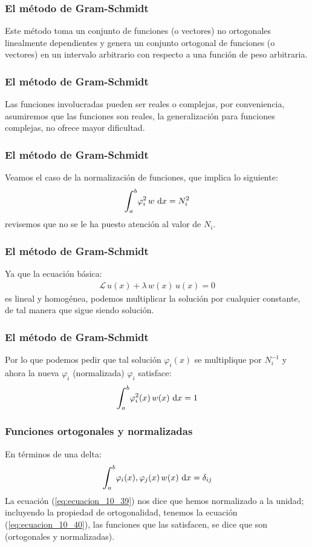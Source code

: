 \documentclass[12pt]{beamer}
\begin{document}
\begin{frame}
\frametitle{El método de Gram-Schmidt}
Este método toma un conjunto de funciones (o vectores) no ortogonales linealmente dependientes y genera un conjunto ortogonal de funciones (o vectores) en un intervalo arbitrario con respecto a una función de peso arbitraria.
\end{frame}
\begin{frame}
\frametitle{El método de Gram-Schmidt}
Las funciones involucradas pueden ser reales o complejas, por conveniencia, asumiremos que las funciones son reales, la generalización para funciones complejas, no ofrece mayor dificultad.
\end{frame}
\begin{frame}
\frametitle{El método de Gram-Schmidt}
Veamos el caso de la normalización de funciones, que implica lo siguiente:
\pause
\begin{align*}
\scaleint{6ex}_{\bs a}^{b} \varphi_{i}^{2} \, w \, \dd{x}  =  N_{i}^{2}
\end{align*}
revisemos que no se le ha puesto atención al valor de $N_{i}$.
\end{frame}
\begin{frame}
\frametitle{El método de Gram-Schmidt}
Ya que la ecuación básica:
\pause
\begin{align}
\mathcal{L} \, u(x) + \lambda \, w(x) \, u(x) = 0
\label{eq:ecuacion_10_08}
\end{align}
es lineal y homogénea, podemos multiplicar la solución por cualquier constante, de tal manera que sigue siendo solución.
\end{frame}
\begin{frame}
\frametitle{El método de Gram-Schmidt}
Por lo que podemos pedir que tal solución $\varphi_{i}(x)$ se multiplique por $N_{i}^{-1}$ y ahora la nueva $\varphi_{i}$ (normalizada) $\varphi_{i}$ satisface:
\pause
\begin{align}
\scaleint{6ex}_{\bs a}^{b} \varphi_{i}^{2} (x) \, w(x) \, \dd{x} = 1
\label{eq:ecuacion_10_39}
\end{align}
\end{frame}
\begin{frame}
\frametitle{Funciones ortogonales y normalizadas}
En términos de una delta:
\pause
\begin{align}
\scaleint{6ex}_{\bs a}^{b} \varphi_{i}(x) , \varphi_{j} (x) \, w(x) \, \dd{x} = \delta_{ij}
\label{eq:ecuacion_10_40}
\end{align}
La ecuación (\ref{eq:ecuacion_10_39}) nos dice que hemos normalizado a la unidad; incluyendo la propiedad de ortogonalidad, tenemos la ecuación (\ref{eq:ecuacion_10_40}), las funciones que las satisfacen, se dice que son  (ortogonales y normalizadas).
\end{frame}
\end{document}
